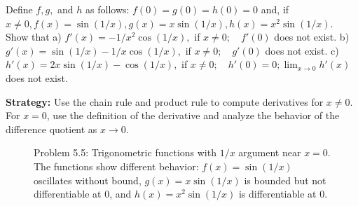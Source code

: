 \begin{problembox}
Define \( f, g, \) and \( h \) as follows: \( f(0) = g(0) = h(0) = 0 \) and, if \( x \neq 0, f(x) = \sin (1/x), g(x) = x \sin (1/x), h(x) = x^2 \sin (1/x) \). Show that
a) \( f'(x) = -1/x^2 \cos (1/x), \) if \( x \neq 0; \quad f'(0) \) does not exist.
b) \( g'(x) = \sin (1/x) - 1/x \cos (1/x), \) if \( x \neq 0; \quad g'(0) \) does not exist.
c) \( h'(x) = 2x \sin (1/x) - \cos (1/x), \) if \( x \neq 0; \quad h'(0) = 0; \lim_{x \to 0} h'(x) \) does not exist.
\end{problembox}

\noindent\textbf{Strategy:} Use the chain rule and product rule to compute derivatives for \( x \neq 0 \). For \( x = 0 \), use the definition of the derivative and analyze the behavior of the difference quotient as \( x \to 0 \).

\begin{figure}[h]
\centering
{}
\caption{Problem 5.5: Trigonometric functions with $1/x$ argument near $x=0$. The functions show different behavior: $f(x) = \sin(1/x)$ oscillates without bound, $g(x) = x\sin(1/x)$ is bounded but not differentiable at 0, and $h(x) = x^2\sin(1/x)$ is differentiable at 0.}
\end{figure}

